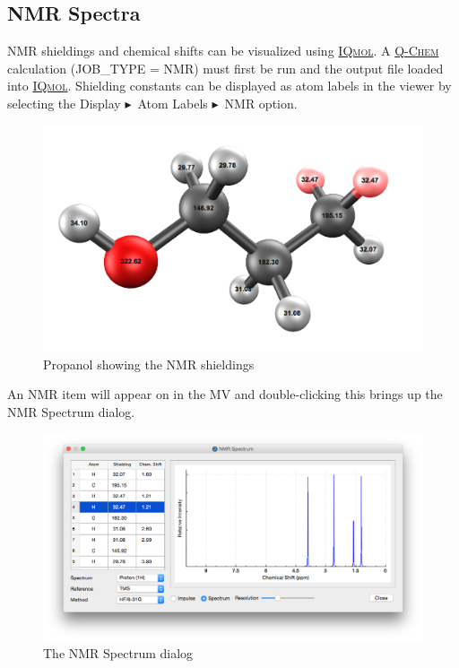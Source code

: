 \documentclass[a4paper,12pt]{article}
\newcommand{\qchem}{\href{http://q-chem.com}{{\scshape Q-Chem}}}
\newcommand{\iqmol}{\href{http://iqmol.org}{{\scshape IQmol}}}
\newcommand{\bt}{\ensuremath{\blacktriangleright}}
\begin{document}
\subsection{NMR Spectra}

NMR shieldings and chemical shifts can be visualized using \iqmol{}.  A 
\qchem{} calculation (JOB\_TYPE = NMR) must first be run and the output
file loaded into \iqmol{}.  Shielding constants can be displayed as atom labels
in the viewer by selecting the Display \bt\ Atom Labels \bt\ NMR option.
\begin{figure}[h]
\begin{center}
\includegraphics[scale=0.20]{figures/NmrDisplay.png}
\caption{Propanol showing the NMR shieldings}
\end{center}
\end{figure}

An NMR item will appear on in the MV and double-clicking this brings up the NMR
Spectrum dialog.
\begin{figure}[h]
\begin{center}
\includegraphics[scale=0.35]{figures/NmrConfigurator.png}
\caption{The NMR Spectrum dialog}
\end{center}
\end{figure}
\end{document}
